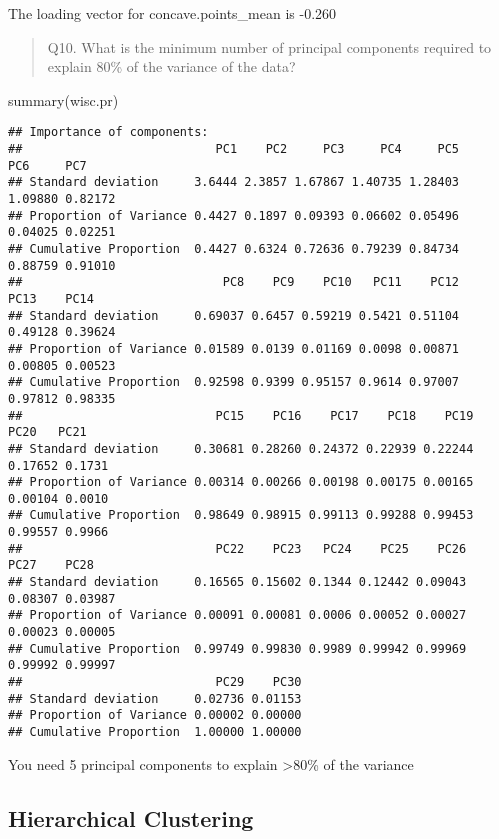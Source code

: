 \documentclass[
]{article}
\newenvironment{Shaded}{\begin{snugshade}}{\end{snugshade}}
\newcommand{\FunctionTok}[1]{\textcolor[rgb]{0.00,0.00,0.00}{#1}}
\newcommand{\NormalTok}[1]{#1}
\begin{document}
The loading vector for concave.points\_mean is -0.260

\begin{quote}
Q10. What is the minimum number of principal components required to
explain 80\% of the variance of the data?
\end{quote}

\begin{Shaded}
\begin{Highlighting}[]
\FunctionTok{summary}\NormalTok{(wisc.pr)}
\end{Highlighting}
\end{Shaded}

\begin{verbatim}
## Importance of components:
##                           PC1    PC2     PC3     PC4     PC5     PC6     PC7
## Standard deviation     3.6444 2.3857 1.67867 1.40735 1.28403 1.09880 0.82172
## Proportion of Variance 0.4427 0.1897 0.09393 0.06602 0.05496 0.04025 0.02251
## Cumulative Proportion  0.4427 0.6324 0.72636 0.79239 0.84734 0.88759 0.91010
##                            PC8    PC9    PC10   PC11    PC12    PC13    PC14
## Standard deviation     0.69037 0.6457 0.59219 0.5421 0.51104 0.49128 0.39624
## Proportion of Variance 0.01589 0.0139 0.01169 0.0098 0.00871 0.00805 0.00523
## Cumulative Proportion  0.92598 0.9399 0.95157 0.9614 0.97007 0.97812 0.98335
##                           PC15    PC16    PC17    PC18    PC19    PC20   PC21
## Standard deviation     0.30681 0.28260 0.24372 0.22939 0.22244 0.17652 0.1731
## Proportion of Variance 0.00314 0.00266 0.00198 0.00175 0.00165 0.00104 0.0010
## Cumulative Proportion  0.98649 0.98915 0.99113 0.99288 0.99453 0.99557 0.9966
##                           PC22    PC23   PC24    PC25    PC26    PC27    PC28
## Standard deviation     0.16565 0.15602 0.1344 0.12442 0.09043 0.08307 0.03987
## Proportion of Variance 0.00091 0.00081 0.0006 0.00052 0.00027 0.00023 0.00005
## Cumulative Proportion  0.99749 0.99830 0.9989 0.99942 0.99969 0.99992 0.99997
##                           PC29    PC30
## Standard deviation     0.02736 0.01153
## Proportion of Variance 0.00002 0.00000
## Cumulative Proportion  1.00000 1.00000
\end{verbatim}

You need 5 principal components to explain \textgreater80\% of the
variance

\hypertarget{hierarchical-clustering}{%
\subsection{Hierarchical Clustering}\label{hierarchical-clustering}}
\end{document}
